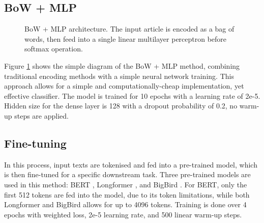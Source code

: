 \subsection{BoW + MLP}

\begin{figure}[htbp]
    \centering
    \caption{BoW + MLP architecture. The input article is encoded as a bag of words, then feed into a single linear multilayer perceptron before softmax operation.}
    \label{fig:bow_mlp_architecture}
\end{figure}

Figure \ref{fig:bow_mlp_architecture} shows the simple diagram of the BoW + MLP method, combining traditional encoding methods with a simple neural network training. This approach allows for a simple and computationally-cheap implementation, yet effective classifier. The model is trained for 10 epochs with a learning rate of 2e-5. Hidden size for the dense layer is 128 with a dropout probability of 0.2, no warm-up steps are applied.

\subsection{Fine-tuning}

In this process, input texts are tokenised and fed into a pre-trained model, which is then fine-tuned for a specific downstream task. Three pre-trained models are used in this method: BERT \cite{devlin-2019-bert}, Longformer \cite{beltagy-2020-longformer}, and BigBird \cite{zaheer-2021-bigbird}. For BERT, only the first 512 tokens are fed into the model, due to its token limitations, while both Longformer and BigBird allows for up to 4096 tokens. Training is done over 4 epochs with weighted loss, 2e-5 learning rate, and 500 linear warm-up steps.


